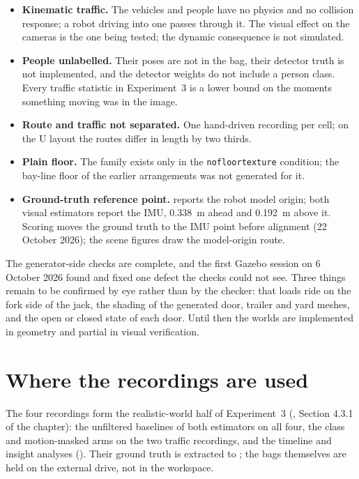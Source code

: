\documentclass[11pt,a4paper,notitlepage]{report}
\begin{document}
\begin{itemize}
\item \textbf{Kinematic traffic.} The vehicles and people have no physics and
      no collision response; a robot driving into one passes through it. The
      visual effect on the cameras is the one being tested; the dynamic
      consequence is not simulated.
\item \textbf{People unlabelled.} Their poses are not in the bag, their
      detector truth is not implemented, and the detector weights do not
      include a person class. Every traffic statistic in Experiment~3 is a
      lower bound on the moments something moving was in the image.
\item \textbf{Route and traffic not separated.} One hand-driven recording per
      cell; on the U layout the routes differ in length by two thirds.
\item \textbf{Plain floor.} The family exists only in the
      \texttt{nofloortexture} condition; the bay-line floor of the earlier
      arrangements was not generated for it.
\item \textbf{Ground-truth reference point.} 
      reports the robot model origin; both visual estimators report the IMU,
      \SI{0.338}{\metre} ahead and \SI{0.192}{\metre} above it. Scoring moves
      the ground truth to the IMU point before alignment (22 October 2026); the
      scene figures draw the model-origin route.
\end{itemize}

\begin{queried}
The generator-side checks are complete, and the first Gazebo session on
6 October 2026 found and fixed one defect the checks could not see. Three
things remain to be confirmed by eye rather than by the checker: that loads
ride on the fork side of the jack, the shading of the generated door, trailer
and yard meshes, and the open or closed state of each door. Until then the
worlds are implemented in geometry and partial in visual verification.
\end{queried}

\section{Where the recordings are used}

The four recordings form the realistic-world half of Experiment~3
(, Section 4.3.1 of the chapter): the unfiltered
baselines of both estimators on all four, the class and motion-masked arms on
the two traffic recordings, and the timeline and insight analyses
(). Their ground truth is extracted to
;
the bags themselves are held on the external drive, not in the workspace.
\end{document}
